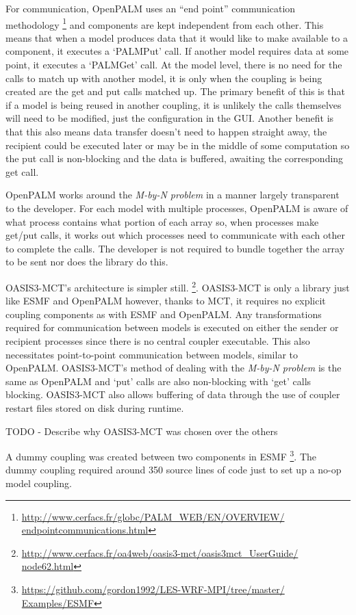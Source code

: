 \documentclass{acm_proc_article-sp}
\renewcommand{\_}{\underscore\hspace{0pt}}
\begin{document}
For communication, OpenPALM uses an ``end point'' communication methodology
\footnote{\url{http://www.cerfacs.fr/globc/PALM_WEB/EN/OVERVIEW/
endpointcommunications.html}} and components are kept independent from each
other. This means that when a model produces data that it would like to make
available to a component, it executes a `PALM\_Put' call. If another model
requires data at some point, it executes a `PALM\_Get' call. At the model level,
there is no need for the calls to match up with another model, it is only when
the coupling is being created are the get and put calls matched up. The primary
benefit of this is that if a model is being reused in another coupling, it is
unlikely the calls themselves will need to be modified, just the configuration
in the GUI. Another benefit is that this also means data transfer doesn't need
to happen straight away, the recipient could be executed later or may be in the
middle of some computation so the put call is non-blocking and the data is
buffered, awaiting the corresponding get call.

OpenPALM works around the \textit{M-by-N problem} in a manner largely
transparent to the developer. For each model with multiple processes, OpenPALM
is aware of what process contains what portion of each array so, when processes
make get/put calls, it works out which processes need to communicate with each
other to complete the calls. The developer is not required to bundle together
the array to be sent nor does the library do this.

OASIS3-MCT's architecture is simpler still.
\footnote{\url{http://www.cerfacs.fr/oa4web/oasis3-mct/oasis3mct_UserGuide/
node62.html}}. OASIS3-MCT is only a library just like ESMF and OpenPALM however,
thanks to MCT, it requires no explicit coupling components as with ESMF and
OpenPALM. Any transformations required for communication between models is
executed on either the sender or recipient processes since there is no central
coupler executable. This also necessitates point-to-point communication between
models, similar to OpenPALM. OASIS3-MCT's method of dealing with the
\textit{M-by-N problem} is the same as OpenPALM and `put' calls are also
non-blocking with `get' calls blocking. OASIS3-MCT also allows buffering of data
through the use of coupler restart files stored on disk during runtime.

TODO - Describe why OASIS3-MCT was chosen over the others


A dummy coupling was created between two components in ESMF
\footnote{\url{https://github.com/gordon1992/LES-WRF-MPI/tree/master/
Examples/ESMF}}.
The dummy coupling required around 350 source lines of code just to set up a
no-op model coupling.
\end{document}
